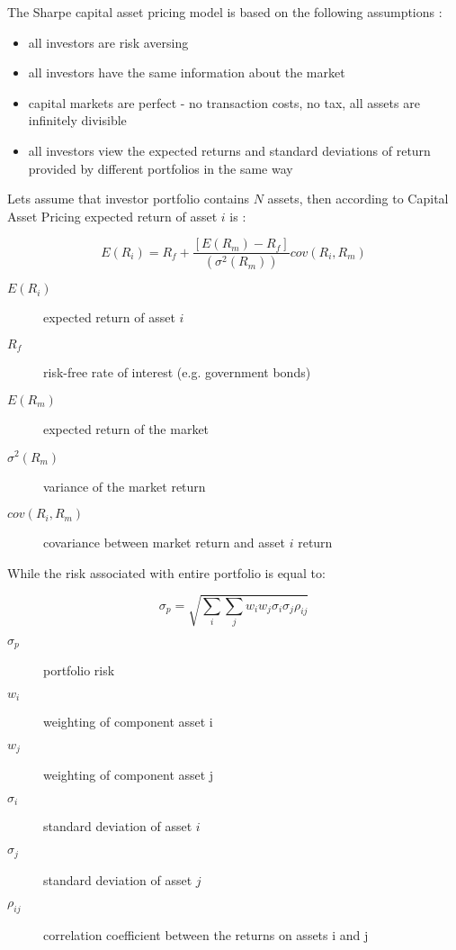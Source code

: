 The Sharpe capital asset pricing model is based on the following assumptions \cite{CAPM}:

\begin{itemize}
  \item all investors are risk aversing
  \item all investors have the same information about the market
  \item capital markets are perfect - no transaction costs, no tax, all assets are infinitely divisible
  \item all investors view the expected returns and standard deviations of return provided by different portfolios in the same way
\end{itemize}
 
Lets assume that investor portfolio contains $N$ assets, then according to Capital Asset Pricing expected return of asset $i$ is \cite{CAPM}: 

\begin{equation}
\label{first_eq}
 E(R_{i})  = R_{f} + \frac{ [E(R_{m}) - R_{f}]} {(\sigma^2(R_{m}))} cov(R_{i}, R_{m})
\end{equation} 

\begin{description}
  \item [$E(R_{i})$]
    expected return of asset $i$
  \item [$R_{f}$]
    risk-free rate of interest (e.g. government bonds)
  \item [$E(R_{m})$]
    expected return of the market
  \item [$\sigma^2(R_{m})$]
    variance of the market return
  \item [$cov(R_{i}, R_{m})$]
    covariance between market return and asset $i$ return
\end{description}

While the risk associated with entire portfolio is equal to:

\begin{equation}
\label{sec_eq}
 \sigma_{p}  = \sqrt{\sum_{i} \sum_{j} w_{i}w_{j} \sigma_{i} \sigma_{j} \rho_{ij}}
\end{equation} 

\begin{description}
  \item [$\sigma_{p}$]
    portfolio risk
  \item [$w_{i}$]
    weighting of component asset i
  \item [$w_{j}$]
    weighting of component asset j
  \item [$\sigma_{i}$]
    standard deviation of asset $i$
  \item [$\sigma_{j}$]
    standard deviation of asset $j$
  \item [$\rho_{ij}$]
    correlation coefficient between the returns on assets i and j
\end{description}
 



